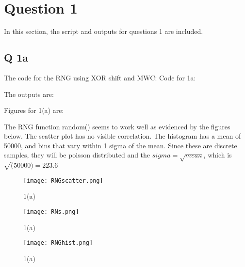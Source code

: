 

\section{Question 1}

In this section, the script and outputs for questions 1 are included. 
 

\subsection{Q 1a}
The code for the RNG using XOR shift and MWC: Code for 1a:


The outputs are:


Figures for 1(a) are:

The RNG function random() seems to work well as evidenced by the figures below. The scatter plot has no visible correlation. The histogram has a mean of 50000, and bins that vary within 1 sigma of the mean. Since these are discrete samples, they will be poisson distributed and the $ sigma = \sqrt{mean}$, which is $\sqrt(50000) = 223.6$

\begin{figure}[h!]
  \centering
  \texttt{[image: RNGscatter.png]}
  \caption{1(a)}
  \label{fig:fig1}
\end{figure}

\begin{figure}[h!]
  \centering
  \texttt{[image: RNs.png]}
  \caption{1(a)}
  \label{fig:fig2}
\end{figure}

\begin{figure}[h!]
  \centering
  \texttt{[image: RNGhist.png]}
  \caption{1(a)}
  \label{fig:fig2}
\end{figure}



